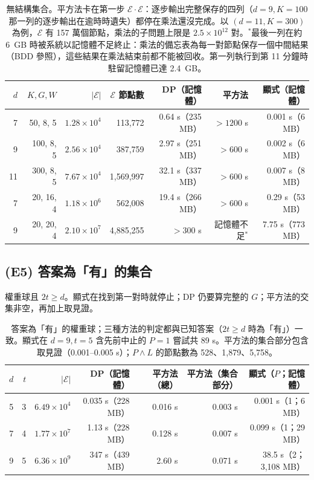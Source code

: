 \documentclass[a4paper,11pt,fontset=none]{ctexart}
\newcommand{\E}{\mathcal{E}}
\theoremstyle{definition}
\begin{document}
\begin{table}[H]
\centering
\footnotesize
\setlength{\tabcolsep}{4pt}
\begin{tabular}{@{}rrrrrrr@{}}
\toprule
$d$ & $K,G,W$ & $\lvert\E\rvert$ & $\E$ 節點數 & DP（記憶體） & 平方法 & 顯式（記憶體）\\
\midrule
7  & 50, 8, 5   & $1.28\times10^4$ & 113,772 & 0.64 s（235 MB） & $>1200$ s & 0.001 s（6 MB）\\
9  & 100, 8, 5  & $2.56\times10^4$ & 387,759 & 2.97 s（251 MB） & $>600$ s & 0.002 s（6 MB）\\
11 & 300, 8, 5  & $7.67\times10^4$ & 1,569,997 & 32.1 s（337 MB） & $>600$ s & 0.007 s（8 MB）\\
7  & 20, 16, 4  & $1.18\times10^6$ & 562,008 & 19.4 s（266 MB） & $>600$ s & 0.29 s（53 MB）\\
9  & 20, 20, 4  & $2.10\times10^7$ & 4,885,255 & $>300$ s & 記憶體不足$^*$ & 7.75 s（773 MB）\\
\bottomrule
\end{tabular}
\caption{無結構集合。平方法卡在第一步 $\E\cdot\E$：逐步輸出完整保存的四列（$d{=}9,K{=}100$ 那一列的逐步輸出在逾時時遺失）都停在乘法還沒完成。以 $(d{=}11,K{=}300)$ 為例，$\E$ 有 157 萬個節點，乘法的子問題上限是 $2.5\times10^{12}$ 對。$^*$最後一列在約 6~GB 時被系統以記憶體不足終止：乘法的備忘表為每一對節點保存一個中間結果（BDD 參照），這些結果在乘法結束前都不能被回收。第一列執行到第 11 分鐘時駐留記憶體已達 2.4~GB。}\label{tab:e4}
\end{table}

\subsection{(E5) 答案為「有」的集合}

權重球且 $2t\ge d$。顯式在找到第一對時就停止；DP 仍要算完整的 $G$；平方法的交集非空，再加上取見證。

\begin{table}[H]
\centering
\small
\begin{tabular}{@{}rrrrrrr@{}}
\toprule
$d$ & $t$ & $\lvert\E\rvert$ & DP（記憶體） & 平方法（總） & 平方法（集合部分） & 顯式（$P$；記憶體）\\
\midrule
5 & 3 & $6.49\times10^4$ & 0.035 s（228 MB） & 0.016 s & 0.003 s & 0.001 s（1；6 MB）\\
7 & 4 & $1.77\times10^7$ & 1.13 s（228 MB） & 0.128 s & 0.007 s & 0.099 s（1；29 MB）\\
9 & 5 & $6.36\times10^9$ & 347 s（439 MB） & 2.60 s & 0.071 s & 38.5 s（2；3,108 MB）\\
\bottomrule
\end{tabular}
\caption{答案為「有」的權重球；三種方法的判定都與已知答案（$2t\ge d$ 時為「有」）一致。顯式在 $d{=}9,t{=}5$ 含先前中止的 $P=1$ 嘗試共 89 s。平方法的集合部分包含取見證（0.001--0.005 s）；$P\wedge L$ 的節點數為 528、1,879、5,758。}\label{tab:e5}
\end{table}
\end{document}
